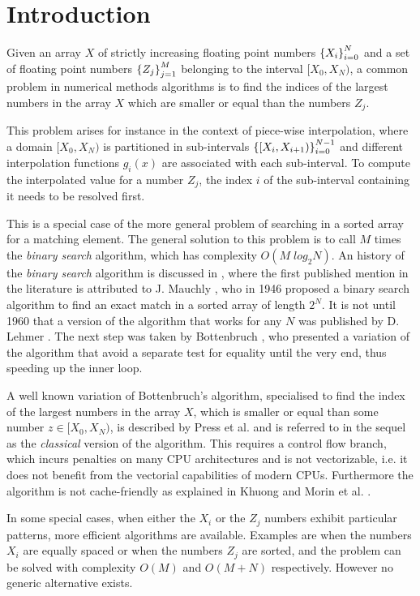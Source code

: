 \documentclass[preprint,1p,times]{elsarticle}
\begin{document}
\section{Introduction}
Given an array $X$ of strictly increasing floating point numbers $\left \{ X_i \right \}_{i=0}^{N}$  
and a set of floating point numbers $\left \{ Z_j \right \}_{j=1}^M$ belonging to the interval $[X_0,X_N)$,
a common problem in numerical methods algorithms is to find the indices of 
the largest numbers in the array $X$ which are smaller or equal than the numbers $Z_j$.

This problem arises for instance in the context of piece-wise interpolation, where a domain $[X_0,X_N)$ 
is partitioned in sub-intervals $\left \{ [X_{i},X_{i+1}) \right \}_{i=0}^{N-1}$ and different interpolation 
functions $g_i(x)$ are associated with each sub-interval. To compute the interpolated value for a number
$Z_j$, the index $i$ of the sub-interval containing it needs to be resolved first.

This is a special case of the more general problem of searching in a sorted array for a matching element. The general solution to this problem is to call $M$ times the \textit{binary search} algorithm, which has complexity $O\left(M\;log_2N\right)$. An history of the \textit{binary search} algorithm is discussed in \cite{Knuth1997}, where the first published mention in the literature is attributed to J. Mauchly \cite{Mauchly1946}, who in 1946 proposed a binary search algorithm to find an exact match in a sorted array of length $2^N$. It is not until 1960 that a version of the algorithm that works for any $N$ was published by D. Lehmer \cite{Lehmer1960}. The next step was taken by Bottenbruch \cite{Bottenbruch1962}, who presented a variation of the algorithm that avoid a separate test for equality until the very end, thus speeding up the inner loop.

A well known variation of Bottenbruch's algorithm, specialised to find the index of the largest numbers in the array $X$, which is smaller or equal than some number $z\in[X_0,X_N)$, is described by Press et al. \cite{NRC++} and is referred to in the sequel as the \textit{classical} version of the algorithm.
This requires a control flow branch, which incurs penalties on many CPU architectures and is not vectorizable, i.e. it does not benefit from the vectorial capabilities of modern CPUs. Furthermore the algorithm is not cache-friendly as explained in Khuong \cite{Khuong2012} and Morin et al. \cite{Morin2015}.

In some special cases, when either the $X_i$ or the $Z_j$ numbers exhibit particular patterns, more efficient algorithms are available. 
Examples are when the numbers $X_i$ are equally spaced or when the numbers $Z_j$ are sorted, 
and the problem can be solved with complexity $O(M)$ and $O(M+N)$ respectively. However no generic alternative exists.
\end{document}
